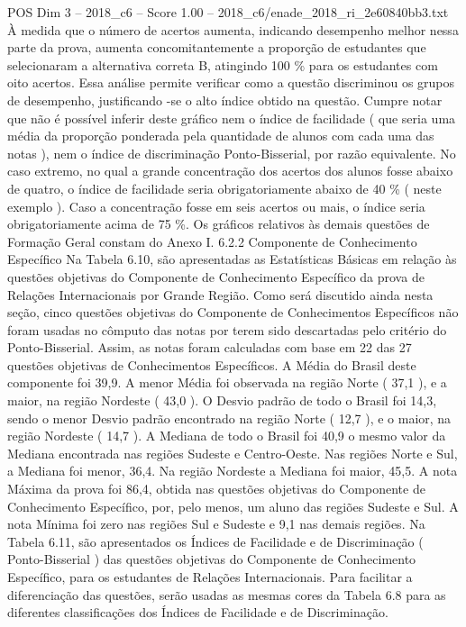 \begin{textsample}{POS Dim 3 – 2018\_c6 – Score 1.00 – 2018\_c6/enade\_2018\_ri\_2e60840bb3.txt}
À medida que o número de acertos aumenta, indicando desempenho melhor nessa parte da prova, aumenta concomitantemente a proporção de estudantes que selecionaram a alternativa correta B, atingindo 100 \% para os estudantes com oito acertos.
Essa análise permite verificar como a questão discriminou os grupos de desempenho, justificando -se o alto índice obtido na questão.
Cumpre notar que não é possível inferir deste gráfico nem o índice de facilidade ( que seria uma média da proporção ponderada pela quantidade de alunos com cada uma das notas ), nem o índice de discriminação Ponto-Bisserial, por razão equivalente.
No caso extremo, no qual a grande concentração dos acertos dos alunos fosse abaixo de quatro, o índice de facilidade seria obrigatoriamente abaixo de 40 \% ( neste exemplo ).
Caso a concentração fosse em seis acertos ou mais, o índice seria obrigatoriamente acima de 75 \%.
Os gráficos relativos às demais questões de Formação Geral constam do Anexo I. 6.2.2 Componente de Conhecimento Específico Na Tabela 6.10, são apresentadas as Estatísticas Básicas em relação às questões objetivas do Componente de Conhecimento Específico da prova de Relações Internacionais por Grande Região.
Como será discutido ainda nesta seção, cinco questões objetivas do Componente de Conhecimentos Específicos não foram usadas no cômputo das notas por terem sido descartadas pelo critério do Ponto-Bisserial.
Assim, as notas foram calculadas com base em 22 das 27 questões objetivas de Conhecimentos Específicos.
A Média do Brasil deste componente foi 39,9.
A menor Média foi observada na região Norte ( 37,1 ), e a maior, na região Nordeste ( 43,0 ).
O Desvio padrão de todo o Brasil foi 14,3, sendo o menor Desvio padrão encontrado na região Norte ( 12,7 ), e o maior, na região Nordeste ( 14,7 ).
A Mediana de todo o Brasil foi 40,9 o mesmo valor da Mediana encontrada nas regiões Sudeste e Centro-Oeste.
Nas regiões Norte e Sul, a Mediana foi menor, 36,4.
Na região Nordeste a Mediana foi maior, 45,5.
A nota Máxima da prova foi 86,4, obtida nas questões objetivas do Componente de Conhecimento Específico, por, pelo menos, um aluno das regiões Sudeste e Sul.
A nota Mínima foi zero nas regiões Sul e Sudeste e 9,1 nas demais regiões.
Na Tabela 6.11, são apresentados os Índices de Facilidade e de Discriminação ( Ponto-Bisserial ) das questões objetivas do Componente de Conhecimento Específico, para os estudantes de Relações Internacionais.
Para facilitar a diferenciação das questões, serão usadas as mesmas cores da Tabela 6.8 para as diferentes classificações dos Índices de Facilidade e de Discriminação.

\end{textsample}
